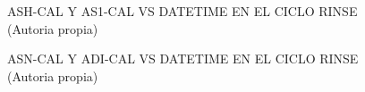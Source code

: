 \begin{figure}[H]
  \hfill
  \hfill
  \hfill
  \caption{ASH-CAL Y AS1-CAL VS DATETIME EN EL CICLO RINSE (Autoria propia)}
  \end{figure}
\begin{figure}[H]
  \hfill
  \hfill
  \hfill
  \caption{ASN-CAL Y ADI-CAL VS DATETIME EN EL CICLO RINSE (Autoria propia)}
  \end{figure}
